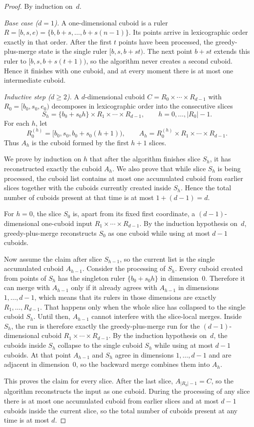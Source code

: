 \documentclass[manuscript,screen,review]{acmart}
\theoremstyle{definition}
\theoremstyle{plain}
\begin{document}
\begin{proof}
By induction on~$d$.

\emph{Base case ($d=1$).}
A one-dimensional cuboid is a ruler $R=[b,s,e)=\{b,b+s,\ldots,b+s(n-1)\}$. Its points arrive in lexicographic order exactly in that order. After the first $t$ points have been processed, the greedy-plus-merge state is the single ruler $[b,s,b+st)$. The next point $b+st$ extends this ruler to $[b,s,b+s(t+1))$, so the algorithm never creates a second cuboid. Hence it finishes with one cuboid, and at every moment there is at most one intermediate cuboid.

\emph{Inductive step ($d \geq 2$).}
A $d$-dimensional cuboid $C = R_0 \times \cdots \times R_{d-1}$ with $R_0=[b_0,s_0,e_0)$ decomposes in lexicographic order into the consecutive slices
\[
  S_h = \{b_0 + s_0 h\} \times R_1 \times \cdots \times R_{d-1},
  \qquad h=0,\ldots,|R_0|-1.
\]
For each $h$, let
\[
  R_0^{(h)} = [b_0,s_0,b_0+s_0(h+1)),
  \qquad
  A_h = R_0^{(h)} \times R_1 \times \cdots \times R_{d-1}.
\]
Thus $A_h$ is the cuboid formed by the first $h+1$ slices.

We prove by induction on $h$ that after the algorithm finishes slice
$S_h$, it has reconstructed exactly the cuboid $A_h$. We also prove
that while slice $S_h$ is being processed, the cuboid list contains at
most one accumulated cuboid from earlier slices together with the
cuboids currently created inside $S_h$. Hence the total number of
cuboids present at that time is at most $1+(d{-}1)=d$.

For $h=0$, the slice $S_0$ is, apart from its fixed first coordinate,
a $(d{-}1)$-dimensional one-cuboid input
$R_1 \times \cdots \times R_{d-1}$. By the induction hypothesis
on~$d$, greedy-plus-merge reconstructs $S_0$ as one cuboid while using
at most $d{-}1$ cuboids.

Now assume the claim after slice $S_{h-1}$, so the current list is the
single accumulated cuboid $A_{h-1}$. Consider the processing of $S_h$.
Every cuboid created from points of $S_h$ has the singleton ruler
$\{b_0+s_0 h\}$ in dimension~0. Therefore it can merge with
$A_{h-1}$ only if it already agrees with $A_{h-1}$ in dimensions
$1,\ldots,d-1$, which means that its rulers in those dimensions are
exactly $R_1,\ldots,R_{d-1}$. That happens only when the whole slice
has collapsed to the single cuboid $S_h$. Until then, $A_{h-1}$
cannot interfere with the slice-local merges. Inside $S_h$, the run is
therefore exactly the greedy-plus-merge run for the
$(d{-}1)$-dimensional cuboid $R_1 \times \cdots \times R_{d-1}$. By
the induction hypothesis on~$d$, the cuboids inside $S_h$ collapse to
the single cuboid $S_h$ while using at most $d{-}1$ cuboids. At that
point $A_{h-1}$ and $S_h$ agree in dimensions $1,\ldots,d-1$ and are
adjacent in dimension~0, so the backward merge combines them into
$A_h$.

This proves the claim for every slice. After the last slice, $A_{|R_0|-1}=C$, so the algorithm reconstructs the input as one cuboid. During the processing of any slice there is at most one accumulated cuboid from earlier slices and at most $d{-}1$ cuboids inside the current slice, so the total number of cuboids present at any time is at most $d$.
\end{proof}
\end{document}
